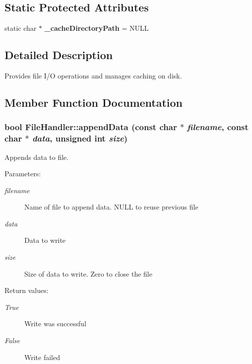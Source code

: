 \subsection*{Static Protected Attributes}
\begin{CompactItemize}
\item 
static char $\ast$ \textbf{\_\-cache\-Directory\-Path} = NULL\label{classoas_1_1FileHandler_8c6f68edb0ee2586bee9ce6c7983a764}

\end{CompactItemize}


\subsection{Detailed Description}
Provides file I/O operations and manages caching on disk. 



\subsection{Member Function Documentation}
\subsubsection{\setlength{\rightskip}{0pt plus 5cm}bool File\-Handler::append\-Data (const char $\ast$ {\em filename}, const char $\ast$ {\em data}, unsigned int {\em size})\hspace{0.3cm}{\tt  [static]}}\label{classoas_1_1FileHandler_4da36625a4e99dc3fd6ab38f571db444}


Appends data to file. 

\begin{Desc}
\item[Parameters:]
\begin{description}
\item[{\em filename}]Name of file to append data. NULL to reuse previous file \item[{\em data}]Data to write \item[{\em size}]Size of data to write. Zero to close the file \end{description}
\end{Desc}
\begin{Desc}
\item[Return values:]
\begin{description}
\item[{\em True}]Write was successful \item[{\em False}]Write failed \end{description}
\end{Desc}
